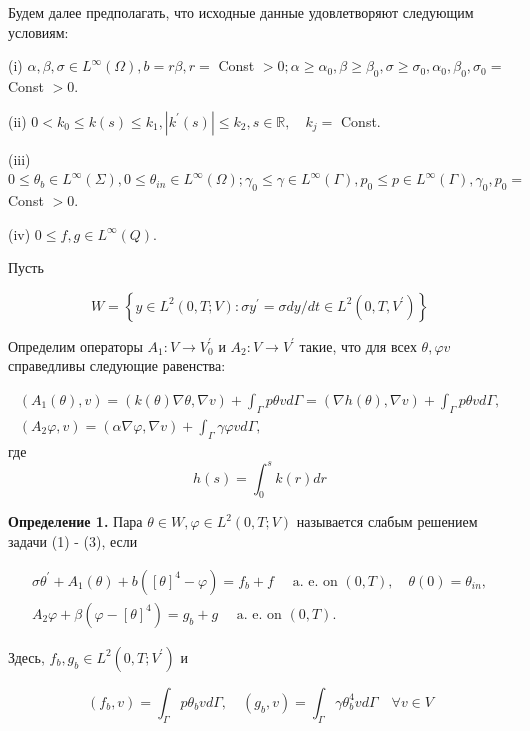 Будем далее предполагать, что исходные данные удовлетворяют следующим условиям:

(i) $\alpha, \beta, \sigma \in L^{\infty}(\Omega), b=r \beta, r=$ Const $>0;
\alpha \geq \alpha_{0}, \beta \geq \beta_{0},
\sigma \geq \sigma_{0}, \alpha_{0}, \beta_{0}, \sigma_{0}=$ Const $>0$.

(ii) $0<k_{0} \leq k(s) \leq k_{1},\left|k^{\prime}(s)\right| \leq k_{2}, s \in \mathbb{R},
\quad k_{j}=$ Const.

(iii) $0 \leq \theta_{b} \in L^{\infty}(\Sigma), 0 \leq \theta_{i n} \in L^{\infty}(\Omega);
\gamma_{0} \leq \gamma \in L^{\infty}(\Gamma),
p_{0} \leq p \in L^{\infty}(\Gamma), \gamma_{0}, p_{0}=$ Const $>0$.

(iv) $0 \leq f, g \in L^{\infty}(Q)$.

Пусть

\[
    W=\left\{y \in L^{2}(0, T ; V): \sigma y^{\prime}=\sigma d y / d t \in L^{2}\left(0, T, V^{\prime}\right)\right\}
\]

Определим операторы $A_{1}: V \rightarrow V_{0}^{\prime}$ и $A_{2}: V \rightarrow V^{\prime}$ такие,
что для всех $\theta, \varphi v$ справедливы следующие равенства:

\[
    \begin{gathered}
        \left(A_{1}(\theta), v\right)=(k(\theta) \nabla \theta, \nabla v)
        +\int_{\Gamma} p \theta v d \Gamma=(\nabla h(\theta), \nabla v)+\int_{\Gamma} p \theta v d \Gamma, \\
        \left(A_{2} \varphi, v\right)=(\alpha \nabla \varphi, \nabla v)
        +\int_{\Gamma} \gamma \varphi v d \Gamma,
    \end{gathered}
\]
где
\[
    h(s)=\int_{0}^{s} k(r) d r
\]

\textbf{Определение 1.}
Пара $\theta \in W, \varphi \in L^{2}(0, T ; V)$ называется слабым решением задачи (1) - (3), если

\[
    \begin{gathered}
        \sigma \theta^{\prime}+A_{1}(\theta)+b\left([\theta]^{4}-\varphi\right)=f_{b}+f
        \quad \text { a. e. on }(0, T), \quad \theta(0)=\theta_{i n}, \\
        A_{2} \varphi+\beta\left(\varphi-[\theta]^{4}\right)=g_{b}+g \quad \text { a. e. on }(0, T).
    \end{gathered}
\]

Здесь, $f_{b}, g_{b} \in L^{2}\left(0, T ; V^{\prime}\right)$ и

\[
    \left(f_{b}, v\right)=\int_{\Gamma} p \theta_{b} v d \Gamma,
    \quad\left(g_{b}, v\right)=\int_{\Gamma} \gamma \theta_{b}^{4} v d \Gamma \quad \forall v \in V
\]

